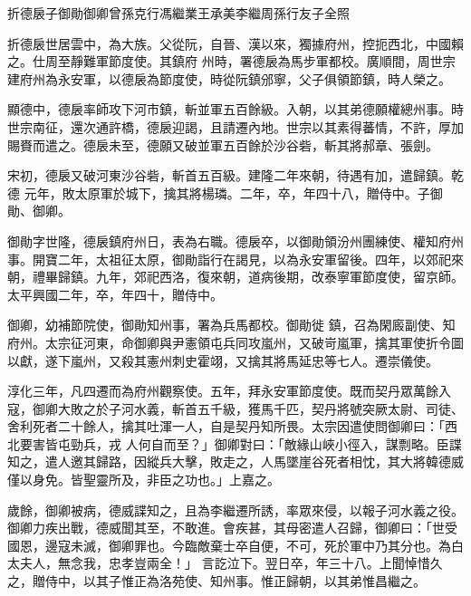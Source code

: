 
\begin{pinyinscope}

 折德扆子御勛御卿曾孫克行馮繼業王承美李繼周孫行友子全照



 折德扆世居雲中，為大族。父從阮，自晉、漢以來，獨據府州，控扼西北，中國賴之。仕周至靜難軍節度使。其鎮府
 州時，署德扆為馬步軍都校。廣順間，周世宗建府州為永安軍，以德扆為節度使，時從阮鎮邠寧，父子俱領節鎮，時人榮之。



 顯德中，德扆率師攻下河市鎮，斬並軍五百餘級。入朝，以其弟德願權總州事。時世宗南征，還次通許橋，德扆迎謁，且請遷內地。世宗以其素得蕃情，不許，厚加賜賚而遣之。德扆未至，德願又破並軍五百餘於沙谷砦，斬其將郝章、張劍。



 宋初，德扆又破河東沙谷砦，斬首五百級。建隆二年來朝，待遇有加，遣歸鎮。乾德
 元年，敗太原軍於城下，擒其將楊璘。二年，卒，年四十八，贈侍中。子御勛、御卿。



 御勛字世隆，德扆鎮府州日，表為右職。德扆卒，以御勛領汾州團練使、權知府州事。開寶二年，太祖征太原，御勛詣行在謁見，以為永安軍留後。四年，以郊祀來朝，禮畢歸鎮。九年，郊祀西洛，復來朝，道病後期，改泰寧軍節度使，留京師。太平興國二年，卒，年四十，贈侍中。



 御卿，幼補節院使，御勛知州事，署為兵馬都校。御勛徙
 鎮，召為閑廄副使、知府州。太宗征河東，命御卿與尹憲領屯兵同攻嵐州，又破岢嵐軍，擒其軍使折令圖以獻，遂下嵐州，又殺其憲州刺史霍翊，又擒其將馬延忠等七人。遷崇儀使。



 淳化三年，凡四遷而為府州觀察使。五年，拜永安軍節度使。既而契丹眾萬餘入寇，御卿大敗之於子河水義，斬首五千級，獲馬千匹，契丹將號突厥太尉、司徒、舍利死者二十餘人，擒其吐渾一人，自是契丹知所畏。太宗因遣使問御卿曰：「西北要害皆屯勁兵，戎
 人何自而至？」御卿對曰：「敵緣山峽小徑入，謀剽略。臣諜知之，遣人邀其歸路，因縱兵大擊，敗走之，人馬墜崖谷死者相忱，其大將韓德威僅以身免。皆聖靈所及，非臣之功也。」上嘉之。



 歲餘，御卿被病，德威諜知之，且為李繼遷所誘，率眾來侵，以報子河水義之役。御卿力疾出戰，德威聞其至，不敢進。會疾甚，其母密遣人召歸，御卿曰：「世受國恩，邊寇未滅，御卿罪也。今臨敵棄士卒自便，不可，死於軍中乃其分也。為白太夫人，無念我，忠孝豈兩全！」
 言訖泣下。翌日卒，年三十八。上聞悼惜久之，贈侍中，以其子惟正為洛苑使、知州事。惟正歸朝，以其弟惟昌繼之。




\end{pinyinscope}
